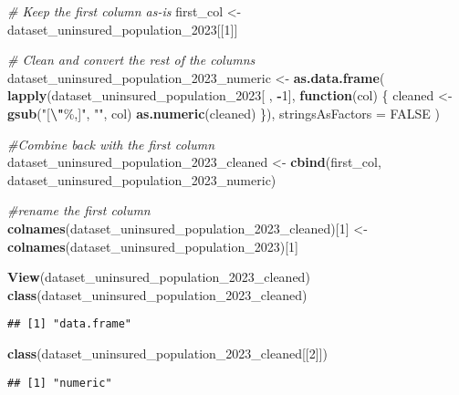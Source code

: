 \documentclass[
]{article}
\newenvironment{Shaded}{\begin{snugshade}}{\end{snugshade}}
\newcommand{\AttributeTok}[1]{\textcolor[rgb]{0.13,0.29,0.53}{#1}}
\newcommand{\CommentTok}[1]{\textcolor[rgb]{0.56,0.35,0.01}{\textit{#1}}}
\newcommand{\ConstantTok}[1]{\textcolor[rgb]{0.56,0.35,0.01}{#1}}
\newcommand{\ControlFlowTok}[1]{\textcolor[rgb]{0.13,0.29,0.53}{\textbf{#1}}}
\newcommand{\DecValTok}[1]{\textcolor[rgb]{0.00,0.00,0.81}{#1}}
\newcommand{\FunctionTok}[1]{\textcolor[rgb]{0.13,0.29,0.53}{\textbf{#1}}}
\newcommand{\NormalTok}[1]{#1}
\newcommand{\OtherTok}[1]{\textcolor[rgb]{0.56,0.35,0.01}{#1}}
\newcommand{\SpecialCharTok}[1]{\textcolor[rgb]{0.81,0.36,0.00}{\textbf{#1}}}
\newcommand{\StringTok}[1]{\textcolor[rgb]{0.31,0.60,0.02}{#1}}
\begin{document}
\begin{Shaded}
\begin{Highlighting}[]
\CommentTok{\# Keep the first column as{-}is}
\NormalTok{first\_col }\OtherTok{\textless{}{-}}\NormalTok{ dataset\_uninsured\_population\_2023[[}\DecValTok{1}\NormalTok{]]}

\CommentTok{\# Clean and convert the rest of the columns}
\NormalTok{dataset\_uninsured\_population\_2023\_numeric }\OtherTok{\textless{}{-}} \FunctionTok{as.data.frame}\NormalTok{(}
  \FunctionTok{lapply}\NormalTok{(dataset\_uninsured\_population\_2023[ , }\SpecialCharTok{{-}}\DecValTok{1}\NormalTok{], }\ControlFlowTok{function}\NormalTok{(col) \{}
\NormalTok{    cleaned }\OtherTok{\textless{}{-}} \FunctionTok{gsub}\NormalTok{(}\StringTok{"[}\SpecialCharTok{\textbackslash{}"}\StringTok{\%,]"}\NormalTok{, }\StringTok{""}\NormalTok{, col)}
    \FunctionTok{as.numeric}\NormalTok{(cleaned)}
\NormalTok{  \}),}
  \AttributeTok{stringsAsFactors =} \ConstantTok{FALSE}
\NormalTok{)}

\CommentTok{\#Combine back with the first column}
\NormalTok{dataset\_uninsured\_population\_2023\_cleaned }\OtherTok{\textless{}{-}} \FunctionTok{cbind}\NormalTok{(first\_col, dataset\_uninsured\_population\_2023\_numeric)}

\CommentTok{\#rename the first column}
\FunctionTok{colnames}\NormalTok{(dataset\_uninsured\_population\_2023\_cleaned)[}\DecValTok{1}\NormalTok{] }\OtherTok{\textless{}{-}} \FunctionTok{colnames}\NormalTok{(dataset\_uninsured\_population\_2023)[}\DecValTok{1}\NormalTok{]}

\FunctionTok{View}\NormalTok{(dataset\_uninsured\_population\_2023\_cleaned)}
\FunctionTok{class}\NormalTok{(dataset\_uninsured\_population\_2023\_cleaned)}
\end{Highlighting}
\end{Shaded}

\begin{verbatim}
## [1] "data.frame"
\end{verbatim}

\begin{Shaded}
\begin{Highlighting}[]
\FunctionTok{class}\NormalTok{(dataset\_uninsured\_population\_2023\_cleaned[[}\DecValTok{2}\NormalTok{]])}
\end{Highlighting}
\end{Shaded}

\begin{verbatim}
## [1] "numeric"
\end{verbatim}
\end{document}
